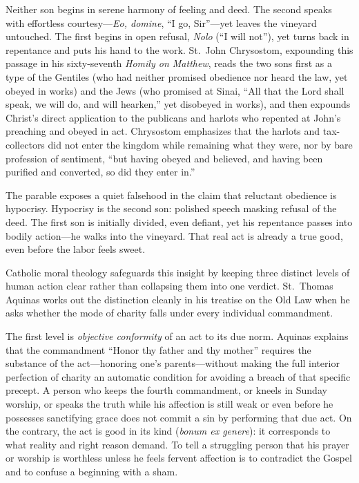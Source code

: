 Neither son begins in serene harmony of feeling and deed. The second speaks with effortless courtesy---\emph{Eo, domine}, ``I go, Sir''---yet leaves the vineyard untouched. The first begins in open refusal, \emph{Nolo} (``I will not''), yet turns back in repentance and puts his hand to the work. St.\ John Chrysostom, expounding this passage in his sixty-seventh \emph{Homily on Matthew}, reads the two sons first as a type of the Gentiles (who had neither promised obedience nor heard the law, yet obeyed in works) and the Jews (who promised at Sinai, ``All that the Lord shall speak, we will do, and will hearken,'' yet disobeyed in works), and then expounds Christ's direct application to the publicans and harlots who repented at John's preaching and obeyed in act. Chrysostom emphasizes that the harlots and tax-collectors did not enter the kingdom while remaining what they were, nor by bare profession of sentiment, ``but having obeyed and believed, and having been purified and converted, so did they enter in.''

The parable exposes a quiet falsehood in the claim that reluctant obedience is hypocrisy. Hypocrisy is the second son: polished speech masking refusal of the deed. The first son is initially divided, even defiant, yet his repentance passes into bodily action---he walks into the vineyard. That real act is already a true good, even before the labor feels sweet.

Catholic moral theology safeguards this insight by keeping three distinct levels of human action clear rather than collapsing them into one verdict. St.\ Thomas Aquinas works out the distinction cleanly in his treatise on the Old Law when he asks whether the mode of charity falls under every individual commandment.

The first level is \emph{objective conformity} of an act to its due norm. Aquinas explains that the commandment ``Honor thy father and thy mother'' requires the substance of the act---honoring one's parents---without making the full interior perfection of charity an automatic condition for avoiding a breach of that specific precept. A person who keeps the fourth commandment, or kneels in Sunday worship, or speaks the truth while his affection is still weak or even before he possesses sanctifying grace does not commit a sin by performing that due act. On the contrary, the act is good in its kind (\emph{bonum ex genere}): it corresponds to what reality and right reason demand. To tell a struggling person that his prayer or worship is worthless unless he feels fervent affection is to contradict the Gospel and to confuse a beginning with a sham.

